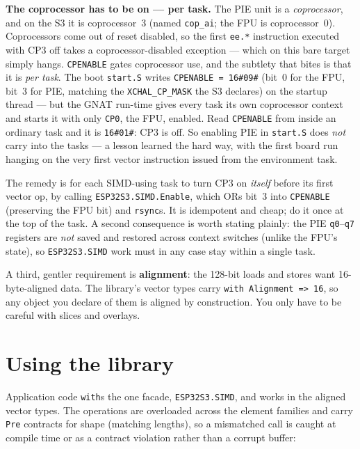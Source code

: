 \textbf{The coprocessor has to be on --- per task.} The PIE unit is a
\emph{coprocessor}, and on the S3 it is coprocessor~3 (named \texttt{cop\_ai}; the
FPU is coprocessor~0). Coprocessors come out of reset disabled, so the first
\texttt{ee.*} instruction executed with CP3 off takes a coprocessor-disabled
exception --- which on this bare target simply hangs. \texttt{CPENABLE} gates
coprocessor use, and the subtlety that bites is that it is \emph{per task}. The boot
\texttt{start.S} writes \texttt{CPENABLE = 16\#09\#} (bit~0 for the FPU, bit~3 for
PIE, matching the \texttt{XCHAL\_CP\_MASK} the S3 declares) on the startup thread ---
but the GNAT run-time gives every task its own coprocessor context and starts it
with only \texttt{CP0}, the FPU, enabled. Read \texttt{CPENABLE} from inside an
ordinary task and it is \texttt{16\#01\#}: CP3 is off. So enabling PIE in
\texttt{start.S} does \emph{not} carry into the tasks --- a lesson learned the hard
way, with the first board run hanging on the very first vector instruction issued
from the environment task.

The remedy is for each SIMD-using task to turn CP3 on \emph{itself} before its first
vector op, by calling \texttt{ESP32S3.SIMD.Enable}, which ORs bit~3 into
\texttt{CPENABLE} (preserving the FPU bit) and \texttt{rsync}s. It is idempotent and
cheap; do it once at the top of the task. A second consequence is worth stating
plainly: the PIE \texttt{q0}--\texttt{q7} registers are \emph{not} saved and restored
across context switches (unlike the FPU's state), so \texttt{ESP32S3.SIMD} work must
in any case stay within a single task.

A third, gentler requirement is \textbf{alignment}: the 128-bit loads and stores
want 16-byte-aligned data. The library's vector types carry
\texttt{with Alignment =>\ 16}, so any object you declare of them is aligned by
construction. You only have to be careful with slices and overlays.

\section{Using the library}

Application code \texttt{with}s the one facade, \texttt{ESP32S3.SIMD}, and works in
the aligned vector types. The operations are overloaded across the element families
and carry \texttt{Pre} contracts for shape (matching lengths), so a mismatched call
is caught at compile time or as a contract violation rather than a corrupt buffer:

